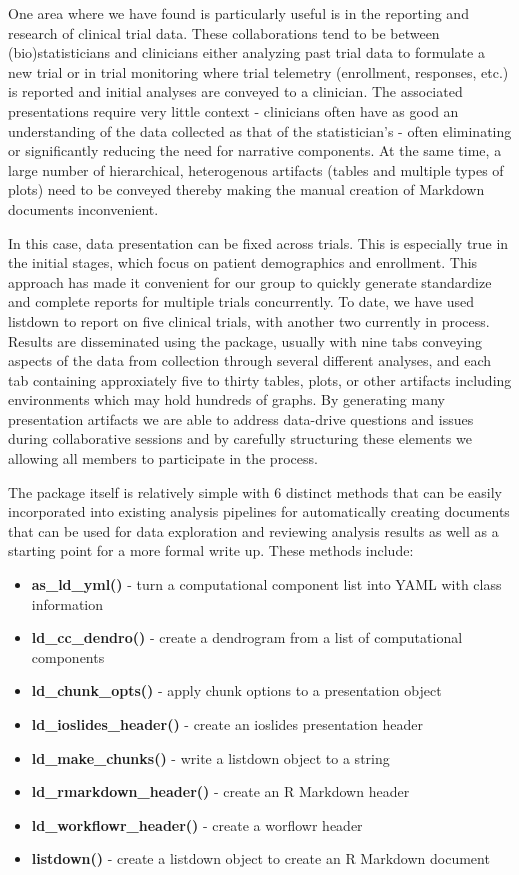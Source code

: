 \documentclass[
]{jss}
\begin{document}
One area where we have found  is particularly useful is in
the reporting and research of clinical trial data. These collaborations
tend to be between (bio)statisticians and clinicians either analyzing
past trial data to formulate a new trial or in trial monitoring where
trial telemetry (enrollment, responses, etc.) is reported and initial
analyses are conveyed to a clinician. The associated presentations
require very little context - clinicians often have as good an
understanding of the data collected as that of the statistician's -
often eliminating or significantly reducing the need for narrative
components. At the same time, a large number of hierarchical,
heterogenous artifacts (tables and multiple types of plots) need to be
conveyed thereby making the manual creation of  Markdown
documents inconvenient.

In this case, data presentation can be fixed across trials. This is
especially true in the initial stages, which focus on patient
demographics and enrollment. This approach has made it convenient for
our group to quickly generate standardize and complete reports for
multiple trials concurrently. To date, we have used listdown to report
on five clinical trials, with another two currently in process. Results
are disseminated using the  package, usually with nine
tabs conveying aspects of the data from collection through several
different analyses, and each tab containing approxiately five to thirty
tables, plots, or other artifacts including 
\citep{trelliscopejs} environments which may hold hundreds of graphs. By
generating many presentation artifacts we are able to address data-drive
questions and issues during collaborative sessions and by carefully
structuring these elements we allowing all members to participate in the
process.

The  package itself is relatively simple with 6 distinct
methods that can be easily incorporated into existing analysis pipelines
for automatically creating documents that can be used for data
exploration and reviewing analysis results as well as a starting point
for a more formal write up. These methods include:

\begin{itemize}
\item{\bf as\_ld\_yml() }{- turn a computational component list into YAML with class information}
\item{\bf ld\_cc\_dendro() }{- create a dendrogram from a list of computational components}
\item{\bf ld\_chunk\_opts() }{- apply chunk options to a presentation object}
\item{\bf ld\_ioslides\_header() }{- create an ioslides presentation header}
\item{\bf ld\_make\_chunks() }{- write a listdown object to a string}
\item{\bf ld\_rmarkdown\_header() }{- create an R Markdown header}
\item{\bf ld\_workflowr\_header() }{- create a worflowr header}
\item{\bf listdown() }{- create a listdown object to create an R Markdown document}
\end{itemize}
\end{document}
